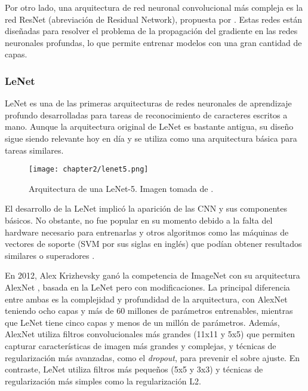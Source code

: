 Por otro lado, una arquitectura de red neuronal convolucional más compleja es la red ResNet (abreviación de Residual
Network), propuesta por \cite{he2016deep}. Estas redes están diseñadas para resolver el problema de la propagación del
gradiente en las redes neuronales profundas, lo que permite entrenar modelos con una gran cantidad de capas.

\subsubsection{LeNet}
LeNet es una de las primeras arquitecturas de redes neuronales de aprendizaje profundo desarrolladas para tareas de
reconocimiento de caracteres escritos a mano. Aunque la arquitectura original de LeNet es bastante antigua, su diseño
sigue siendo relevante hoy en día y se utiliza como una arquitectura básica para tareas similares.

\begin{figure}[H]
  \centering
  \texttt{[image: chapter2/lenet5.png]}

  \caption[Arquitectura de una LeNet-5]{Arquitectura de una LeNet-5. Imagen tomada de \cite{lecun1998gradient}.}
  \label{fig:lenet}
\end{figure}

El desarrollo de la LeNet implicó la aparición de las CNN y sus componentes básicos. No obstante, no fue popular en su
momento debido a la falta del hardware necesario para entrenarlas y otros algoritmos como las máquinas de vectores de
soporte (SVM por sus siglas en inglés) que podían obtener resultados similares o superadores \parencite{lecun1998gradient, decoste2002training, lauer2007trainable}.

En 2012, Alex Krizhevsky ganó la competencia de ImageNet con su arquitectura AlexNet \parencite{krizhevsky2017imagenet}, basada en la LeNet pero con modificaciones. La principal diferencia entre ambas es la
complejidad y profundidad de la arquitectura, con AlexNet teniendo ocho capas y más de 60 millones de parámetros
entrenables, mientras que LeNet tiene cinco capas y menos de un millón de parámetros. Además, AlexNet utiliza filtros
convolucionales más grandes (11x11 y 5x5) que permiten capturar características de imagen más grandes y complejas, y
técnicas de regularización más avanzadas, como el {\it dropout}, para prevenir el sobre ajuste. En contraste, LeNet
utiliza filtros más pequeños (5x5 y 3x3) y técnicas de regularización más simples como la regularización L2.

